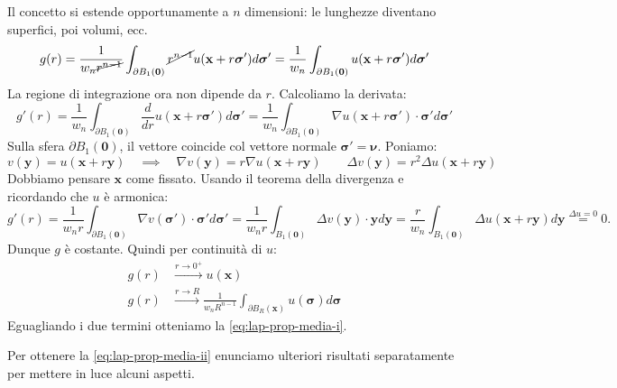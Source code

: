 \documentclass[10pt,a4paper,twoside,openright]{book}
\newcommand{\x}{\mathbf{x}}
\newcommand{\y}{\mathbf{y}}
\newcommand{\zer}{\mathbf{0}}
\begin{document}
\begin{dimostrazione}
	Il concetto si estende opportunamente a $\displaystyle n$ dimensioni: le lunghezze diventano superfici, poi volumi, ecc.
	\begin{equation*}
	g( r) =\frac{1}{w_{n}\cancel{r^{n-1}}}\int _{\partial B_{1}(\zer)}\cancel{r^{n-1}} u(\x +r\bm{\sigma } ') d\bm{\sigma } '=\frac{1}{w_{n}}\int _{\partial B_{1}(\zer)} u(\x +r\bm{\sigma } ') d\bm{\sigma } '
	\end{equation*}
	La regione di integrazione ora non dipende da $\displaystyle r$. Calcoliamo la derivata:
	\begin{equation*}
	g'( r) =\frac{1}{w_{n}}\int _{\partial B_{1}(\zer)}\frac{d}{dr} u(\x +r\bm{\sigma } ') d\bm{\sigma } '=\frac{1}{w_{n}}\int _{\partial B_{1}(\zer)} \nabla u(\x +r\bm{\sigma } ') \cdotp \bm{\sigma } 'd\bm{\sigma } '
	\end{equation*}
	Sulla sfera $\displaystyle \partial B_{1}(\zer)$, il vettore coincide col vettore normale $\displaystyle \bm{\sigma } '=\bm{\nu}$.
	Poniamo:
	\begin{equation*}
		v(\y)=u(\x+r\y) \quad \implies \quad \nabla v(\y)=r\nabla u(\x+r\y)\qquad \Delta v(\y)=r^2 \Delta u(\x+r\y)
	\end{equation*}
	Dobbiamo pensare $\x$ come fissato. Usando il teorema della divergenza e ricordando che $\displaystyle u$ è armonica:
	\begin{equation*}
	g'( r) =\frac{1}{w_{n}r}\int _{\partial B_{1}(\zer)} \nabla  v(\bm{\sigma }') \cdot \bm{\sigma }' d\bm{\sigma }' =\frac{1}{w_{n}r}\int _{B_{1}(\zer)} \Delta   v(\y) \cdot \y d\y   =\frac{r}{w_{n}}\int _{B_{1}(\zer)} \Delta u(\x +r\y) d\y\overset{\Delta u=0}{=} 0.
	\end{equation*}
	Dunque $\displaystyle g$ è costante. Quindi per continuità di $\displaystyle u$:
	\begin{align*}
		g( r) & \xrightarrow{r\rightarrow 0^{+}} u(\x)\\
		g( r) & \xrightarrow{r\rightarrow R}\frac{1}{w_{n} R^{n-1}}\int _{\partial B_{R}(\x)} u(\bm{\sigma }) d\bm{\sigma }
	\end{align*}
	Eguagliando i due termini otteniamo la \eqref{eq:lap-prop-media-i}.
	
	Per ottenere la \eqref{eq:lap-prop-media-ii} enunciamo ulteriori risultati separatamente per mettere in luce alcuni aspetti.
\end{dimostrazione}
\end{document}
